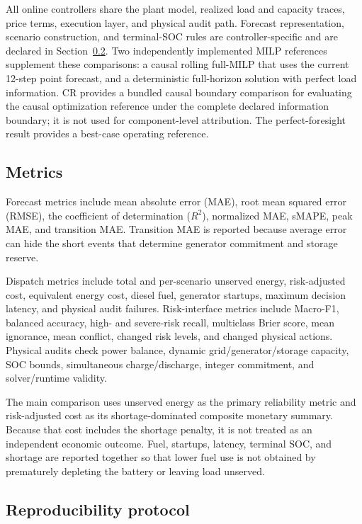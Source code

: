 All online controllers share the plant model, realized load and capacity traces,
price terms, execution layer, and physical audit path. Forecast representation,
scenario construction, and terminal-SOC rules are controller-specific and are
declared in Section~\ref{reproducibility-protocol}. Two
independently implemented MILP references supplement these comparisons: a
causal rolling full-MILP that uses the current 12-step point forecast, and a
deterministic full-horizon solution with perfect load information. CR provides
a bundled causal boundary comparison for evaluating the causal optimization
reference under the complete declared information boundary; it is not used for
component-level attribution. The perfect-foresight result provides a best-case
operating reference.

\subsection{Metrics}\label{metrics}

Forecast metrics include mean absolute error (MAE), root mean squared
error (RMSE), the coefficient of determination ($R^2$), normalized MAE,
sMAPE, peak MAE, and transition MAE. Transition MAE is reported because
average error can hide the short events that determine generator
commitment and storage reserve.

Dispatch metrics include total and per-scenario unserved energy,
risk-adjusted cost, equivalent energy cost, diesel fuel, generator
startups, maximum decision latency, and physical audit failures. Risk-interface
metrics include Macro-F1, balanced accuracy, high- and severe-risk recall,
multiclass Brier score, mean ignorance, mean conflict, changed risk levels, and
changed physical actions.
Physical audits check power balance, dynamic grid/generator/storage
capacity, SOC bounds, simultaneous charge/discharge, integer commitment,
and solver/runtime validity.

The main comparison uses unserved energy as the primary reliability metric and
risk-adjusted cost as its shortage-dominated composite monetary summary. Because
that cost includes the shortage penalty, it is not treated as an independent
economic outcome. Fuel, startups, latency, terminal SOC, and shortage are reported
together so that lower fuel use is not obtained by prematurely depleting the
battery or leaving load unserved.

\subsection{Reproducibility protocol}\label{reproducibility-protocol}


